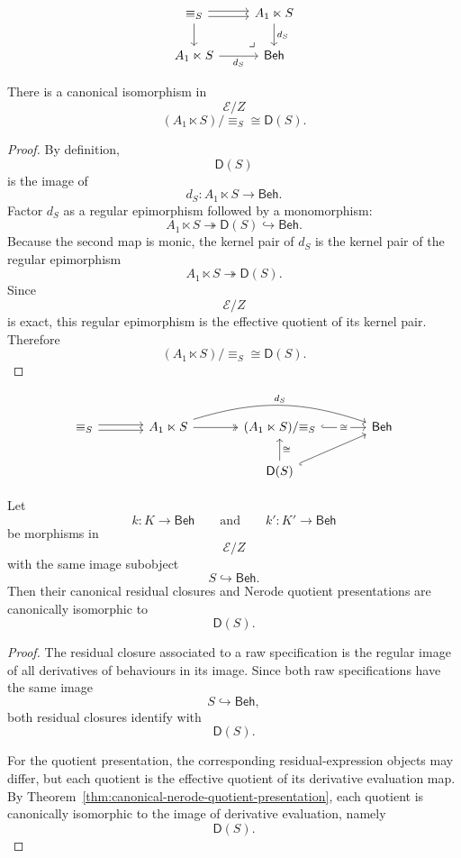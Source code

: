 \[
\begin{tikzcd}
{\equiv_S}
\arrow[r, shift left=0.5ex]
\arrow[r, shift right=0.5ex]
\arrow[d]
&
A_1\ltimes S
\arrow[d, "d_S"]
\\
A_1\ltimes S
\arrow[r, "d_S"']
&
\mathsf{Beh}
\arrow[ul, phantom, "\lrcorner", very near start]
\end{tikzcd}
\]

\begin{theorem}
\label{thm:canonical-nerode-quotient-presentation}
There is a canonical isomorphism in
\[
\mathcal E/Z
\]
\[
(A_1\ltimes S)/{\equiv_S}
\cong
\mathsf D(S).
\]
\end{theorem}

\begin{proof}
By definition,
\[
\mathsf D(S)
\]
is the image of
\[
d_S:
A_1\ltimes S\to\mathsf{Beh}.
\]
Factor \(d_S\) as a regular epimorphism followed by a monomorphism:
\[
A_1\ltimes S
\twoheadrightarrow
\mathsf D(S)
\hookrightarrow
\mathsf{Beh}.
\]
Because the second map is monic, the kernel pair of \(d_S\) is the kernel
pair of the regular epimorphism
\[
A_1\ltimes S
\twoheadrightarrow
\mathsf D(S).
\]
Since
\[
\mathcal E/Z
\]
is exact, this regular epimorphism is the effective quotient of its kernel
pair. Therefore
\[
(A_1\ltimes S)/{\equiv_S}
\cong
\mathsf D(S).
\]
\end{proof}

\[
\begin{tikzcd}[column sep=large]
{\equiv_S}
\arrow[r, shift left=0.5ex]
\arrow[r, shift right=0.5ex]
&
A_1\ltimes S
\arrow[r, two heads]
\arrow[rr, bend left=18, "d_S"]
&
(A_1\ltimes S)/{\equiv_S}
\arrow[r, hook, "\cong" description]
&
\mathsf{Beh}
\\
&&
\mathsf D(S)
\arrow[u, "\cong"']
\arrow[ur, hook']
&
\end{tikzcd}
\]

\begin{proposition}
\label{prop:specifications-depend-only-on-image}
Let
\[
k:K\to\mathsf{Beh}
\qquad\text{and}\qquad
k':K'\to\mathsf{Beh}
\]
be morphisms in
\[
\mathcal E/Z
\]
with the same image subobject
\[
S\hookrightarrow\mathsf{Beh}.
\]
Then their canonical residual closures and Nerode quotient presentations are
canonically isomorphic to
\[
\mathsf D(S).
\]
\end{proposition}

\begin{proof}
The residual closure associated to a raw specification is the regular image of
all derivatives of behaviours in its image. Since both raw specifications
have the same image
\[
S\hookrightarrow\mathsf{Beh},
\]
both residual closures identify with
\[
\mathsf D(S).
\]

For the quotient presentation, the corresponding residual-expression objects
may differ, but each quotient is the effective quotient of its derivative
evaluation map. By
Theorem~\ref{thm:canonical-nerode-quotient-presentation}, each quotient is
canonically isomorphic to the image of derivative evaluation, namely
\[
\mathsf D(S).
\]
\end{proof}

